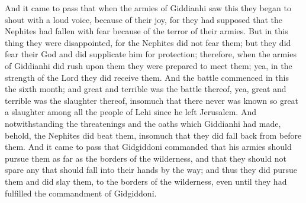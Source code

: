 And it came to pass that when the armies of Giddianhi saw this they began to shout with a loud voice, because of their joy, for they had supposed that the Nephites had fallen with fear because of the terror of their armies.
\bverse \iffalse But in this thing they were disappointed, for the Nephites did not fear them; but they did fear their God and did supplicate him for protection; therefore, when the armies of Giddianhi did rush upon them they were prepared to meet them; yea, in the strength of the Lord they did receive them. \fi
But in this thing they were disappointed, for the Nephites did not fear them; but they did fear their God and did supplicate him for protection; therefore, when the armies of Giddianhi did rush upon them they were prepared to meet them; yea, in the strength of the Lord they did receive them.
\bverse \iffalse And the battle commenced in this the sixth month; and great and terrible was the battle thereof, yea, great and terrible was the slaughter thereof, insomuch that there never was known so great a slaughter among all the people of Lehi since he left Jerusalem. \fi
And the battle commenced in this the sixth month; and great and terrible was the battle thereof, yea, great and terrible was the slaughter thereof, insomuch that there never was known so great a slaughter among all the people of Lehi since he left Jerusalem.
\bverse \iffalse And notwithstanding the threatenings and the oaths which Giddianhi had made, behold, the Nephites did beat them, insomuch that they did fall back from before them. \fi
And notwithstanding the threatenings and the oaths which Giddianhi had made, behold, the Nephites did beat them, insomuch that they did fall back from before them.
\bverse \iffalse And it came to pass that Gidgiddoni commanded that his armies should pursue them as far as the borders of the wilderness, and that they should not spare any that should fall into their hands by the way; and thus they did pursue them and did slay them, to the borders of the wilderness, even until they had fulfilled the commandment of Gidgiddoni. \fi
And it came to pass that Gidgiddoni commanded that his armies should pursue them as far as the borders of the wilderness, and that they should not spare any that should fall into their hands by the way; and thus they did pursue them and did slay them, to the borders of the wilderness, even until they had fulfilled the commandment of Gidgiddoni.
\bverse \iffalse And it came to pass that Giddianhi, who had stood and fought with boldness, was pursued as he fled; and being weary because of his much fighting he was overtaken and slain. And thus was the end of Giddianhi the robber. \fi
